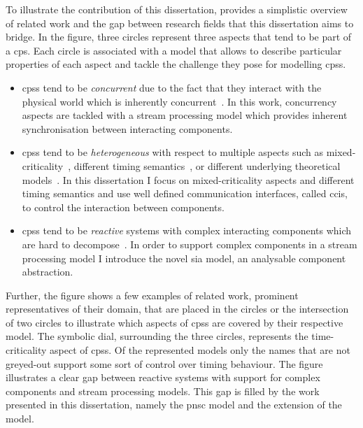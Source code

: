 To illustrate the contribution of this dissertation, \Fig{\ref{fig_trinity}} provides a simplistic overview of related work and the gap between research fields that this dissertation aims to bridge.
In the figure, three circles represent three aspects that tend to be part of a \gls{cps}.
Each circle is associated with a model that allows to describe particular properties of each aspect and tackle the challenge they pose for modelling \glspl{cps}.
\begin{itemize}
    \item \Glspl{cps} tend to be \emph{concurrent} due to the fact that they interact with the physical world which is inherently concurrent~\cite{lee2008}.
        In this work, concurrency aspects are tackled with a stream processing model which provides inherent synchronisation between interacting components.
    \item \Glspl{cps} tend to be \emph{heterogeneous} with respect to multiple aspects such as mixed-criticality~\cite{burns2016}, different timing
        semantics~\cite{kopetz2011}, or different underlying theoretical models~\cite{eker2003}.
        In this dissertation I focus on mixed-criticality aspects and different timing semantics and use well defined communication interfaces, called \glspl{cci}, to control the interaction between components.
    \item \Glspl{cps} tend to be \emph{reactive} systems with complex interacting components which are hard to decompose~\cite{harel1985}.
        In order to support complex components in a stream processing model I introduce the novel \gls{sia} model, an analysable component abstraction.
\end{itemize}

Further, the figure shows a few examples of related work, prominent representatives of their domain, that are placed in the circles or the intersection of two circles to illustrate which aspects of \glspl{cps} are covered by their respective model.
The symbolic dial, surrounding the three circles, represents the time-criticality aspect of \glspl{cps}.
Of the represented models only the names that are not greyed-out support some sort of control over timing behaviour.
The figure illustrates a clear gap between reactive systems with support for complex components and stream processing models.
This gap is filled by the work presented in this dissertation, namely the \gls{pnsc} model and the extension of the model.

